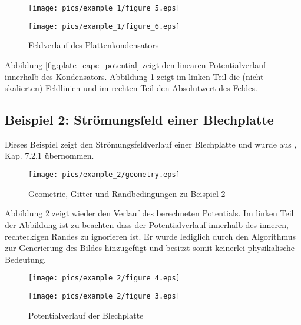 \begin{figure}[htbp]
	\begin{minipage}{0.5\textwidth}
		\texttt{[image: pics/example\_1/figure\_5.eps]}
	\end{minipage}
	\begin{minipage}{0.5\textwidth}
		\texttt{[image: pics/example\_1/figure\_6.eps]}
	\end{minipage}
	\caption{Feldverlauf des Plattenkondensators}
	\label{fig:plate_cape_field}
\end{figure}

Abbildung \ref{fig:plate_cape_potential} zeigt den linearen Potentialverlauf innerhalb des Kondensators. Abbildung \ref{fig:plate_cape_field} zeigt im linken Teil die (nicht skalierten) Feldlinien und im rechten Teil den Absolutwert des Feldes.


\subsection{Beispiel 2: Strömungsfeld einer Blechplatte}
Dieses Beispiel zeigt den Strömungsfeldverlauf einer Blechplatte und wurde aus \cite{SMS_VO_skript}, Kap. 7.2.1 übernommen.\newline

\begin{figure}[H]
	\centering
	\texttt{[image: pics/example\_2/geometry.eps]}
	\caption{Geometrie, Gitter und Randbedingungen zu Beispiel 2}
\end{figure}

Abbildung \ref{fig:metal_plate_potential} zeigt wieder den Verlauf des berechneten Potentials. Im linken Teil der Abbildung ist zu beachten dass der Potentialverlauf innerhalb des inneren, rechteckigen Randes zu ignorieren ist. Er wurde lediglich durch den Algorithmus zur Generierung des Bildes hinzugefügt und besitzt somit keinerlei physikalische Bedeutung.\newline

\begin{figure}[htbp]
	\begin{minipage}{0.5\textwidth}
		\texttt{[image: pics/example\_2/figure\_4.eps]}
	\end{minipage}
	\begin{minipage}{0.5\textwidth}
		\texttt{[image: pics/example\_2/figure\_3.eps]}
	\end{minipage}
	\caption{Potentialverlauf der Blechplatte}
	\label{fig:metal_plate_potential}
\end{figure}


